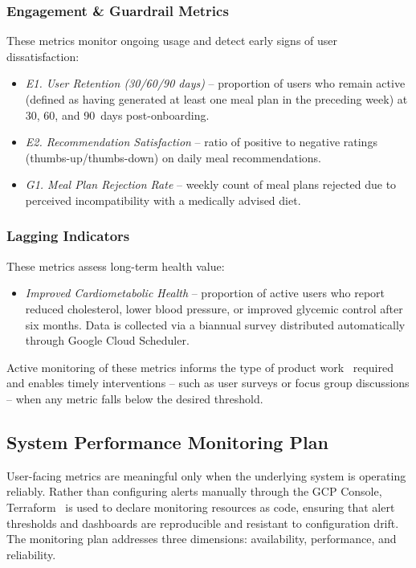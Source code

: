 \documentclass[conference]{IEEEtran}
\begin{document}
\subsubsection{Engagement \& Guardrail Metrics}
These metrics monitor ongoing usage and detect early signs of user dissatisfaction:
\begin{itemize}
    \item \textit{E1. User Retention (30/60/90 days)} -- proportion of users who remain active (defined as having generated at least one meal plan in the preceding week) at 30, 60, and 90~days post-onboarding.
    \item \textit{E2. Recommendation Satisfaction} -- ratio of positive to negative ratings (thumbs-up/thumbs-down) on daily meal recommendations.
    \item \textit{G1. Meal Plan Rejection Rate} -- weekly count of meal plans rejected due to perceived incompatibility with a medically advised diet.
\end{itemize}

\subsubsection{Lagging Indicators}
These metrics assess long-term health value:
\begin{itemize}
    \item \textit{Improved Cardiometabolic Health} -- proportion of active users who report reduced cholesterol, lower blood pressure, or improved glycemic control after six months. Data is collected via a biannual survey distributed automatically through Google Cloud Scheduler.
\end{itemize}

Active monitoring of these metrics informs the type of product work~\cite{b9} required and enables timely interventions -- such as user surveys or focus group discussions -- when any metric falls below the desired threshold.

\subsection{System Performance Monitoring Plan}

User-facing metrics are meaningful only when the underlying system is operating reliably. Rather than configuring alerts manually through the GCP Console, Terraform~\cite{b11} is used to declare monitoring resources as code, ensuring that alert thresholds and dashboards are reproducible and resistant to configuration drift. The monitoring plan addresses three dimensions: availability, performance, and reliability.
\end{document}
